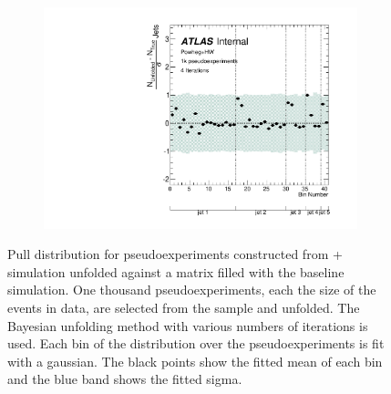 \begin{figure}
\begin{subfigure}[]{0.5\textwidth}
\end{subfigure}
~
\begin{subfigure}[]{0.5\textwidth}
\includegraphics[width=\textwidth]{fig/Stress/105860atlfast/Pull4Iterations.pdf}
\end{subfigure}
\caption{Pull distribution for pseudoexperiments constructed from \pow+\hw~ simulation unfolded against a matrix filled with the baseline simulation. One thousand pseudoexperiments, each the size of the events in data, are selected from the sample and unfolded. The Bayesian unfolding method with various numbers of iterations is used. Each bin of the distribution over the pseudoexperiments is fit with a gaussian. The black points show the fitted mean of each bin and the blue band shows the fitted sigma.}
\label{fig:powhwpull}
\end{figure}
\clearpage
